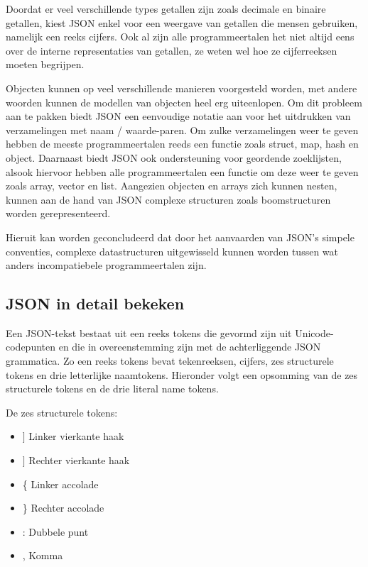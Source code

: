 Doordat er veel verschillende types getallen zijn zoals decimale en binaire getallen, kiest JSON enkel voor een weergave van getallen die mensen gebruiken, namelijk een reeks cijfers. Ook al zijn alle programmeertalen het niet altijd eens over de interne representaties van getallen, ze weten wel hoe ze cijferreeksen moeten begrijpen.

 Objecten kunnen op veel verschillende manieren voorgesteld worden, met andere woorden kunnen de modellen van objecten heel erg uiteenlopen. Om dit probleem aan te pakken biedt JSON een eenvoudige notatie aan voor het uitdrukken van verzamelingen met naam / waarde-paren. Om zulke verzamelingen weer te geven hebben de meeste programmeertalen reeds een functie zoals struct, map, hash en object.
Daarnaast biedt JSON ook ondersteuning voor geordende zoeklijsten, alsook hiervoor hebben alle programmeertalen een functie om deze weer te geven zoals array, vector en list. Aangezien objecten en arrays zich kunnen nesten, kunnen aan de hand van JSON complexe structuren zoals boomstructuren worden gerepresenteerd.

Hieruit kan worden geconcludeerd dat door het aanvaarden van JSON's simpele conventies, complexe datastructuren uitgewisseld kunnen worden tussen wat anders incompatiebele programmeertalen zijn.



\subsection{JSON in detail bekeken}
\label{subsec:JSON in detail bekeken}

Een JSON-tekst bestaat uit een reeks tokens die gevormd zijn uit Unicode-codepunten en die in overeenstemming zijn met de achterliggende JSON grammatica. Zo een reeks tokens bevat tekenreeksen, cijfers, zes structurele tokens en drie letterlijke naamtokens.
Hieronder volgt een opsomming van de zes structurele tokens en de drie literal name tokens.

De zes structurele tokens:

\begin{itemize}
    \item $\rbrack$ Linker vierkante haak
    \item $\rbrack$ Rechter vierkante haak
    \item \{ Linker accolade
    \item \} Rechter accolade
    \item : Dubbele punt
    \item , Komma
\end{itemize}

